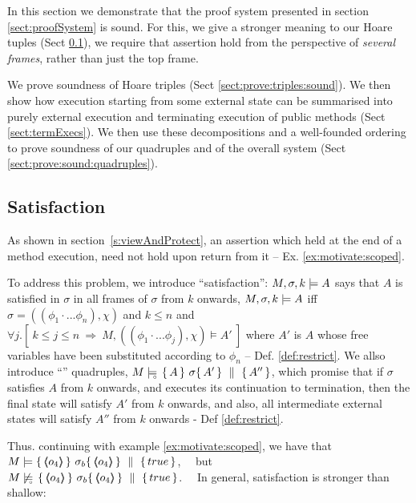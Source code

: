 

In this section we demonstrate that the proof system presented in section \ref{sect:proofSystem} is sound. 
For this, we give a stronger meaning to our Hoare tuples  (Sect \ref{s:scoped:valid}), we require  that   assertion hold from the perspective of \emph{several frames}, rather than just the top frame.

We prove soundness  of Hoare triples (Sect \ref{sect:prove:triples:sound}).
We then show how execution starting from some external state can be summarised into purely external execution and terminating execution of public methods (Sect \ref{sect:termExecs}). We then use these decompositions and a well-founded ordering to prove soundness of our quadruples  and of the overall system (Sect \ref{sect:prove:sound:quadruples}).


\subsection{\Scoped Satisfaction} 
\label{s:scoped:valid}


As shown in section~\ref{s:viewAndProtect}, an assertion which held at the end of a method execution, need not hold upon return from it -- \cf Ex. \ref{ex:motivate:scoped}.  
 


 

To address this problem, we introduce ``\scoped satisfaction'': %
 $ M,\sigma ,{k} \models {A} $   says that $A$ is satisfied in $\sigma$  in all frames of $\sigma$ from $k$ onwards, 
\ie  $ M,\sigma ,{k} \models {A} $ iff $\sigma = ((\phi_1\cdot ... \phi_n), \chi)$ and $k\leq n$ and $\forall j. [\  k\leq j \leq n \ \Rightarrow \ M, ((\phi_1\cdot ... \phi_j), \chi) \models A'\ ]$ where $A'$ is $A$ whose free variables have been substituted according to $\phi_n$ -- \cf Def. \ref{def:restrict}.
We allso introduce ``\scoped'' quadruples,   $M \models\!\!\!\!_{_{\circ}}\   \{\, A \, \}\ \sigma \{\, A' \, \} \, \,\parallel\,\, \{\, A'' \, \} $, which promise that if $\sigma$ satisfies $A$ from $k$ onwards, and executes its continuation to termination, then the final state will satisfy $A'$ from $k$ onwards, and also, all intermediate external states will satisfy $A''$ from $k$ onwards - \cf Def \ref{def:restrict}.


Thus. continuing with example \ref{ex:motivate:scoped},  we have that\ \  $\satisfies {M} {\quadruple   {\inside {o_4}} }   {\sigma_b}   {\inside {o_4}}  {true} $, \ \ 
 but \\ $\notSatisfiesD {M}   {\quadruple   {\inside {o_4}} }  {\sigma_b}   {\inside {o_4}}  {true}  $.
\ \  In general, \scoped satisfaction is stronger than shallow:   
 
